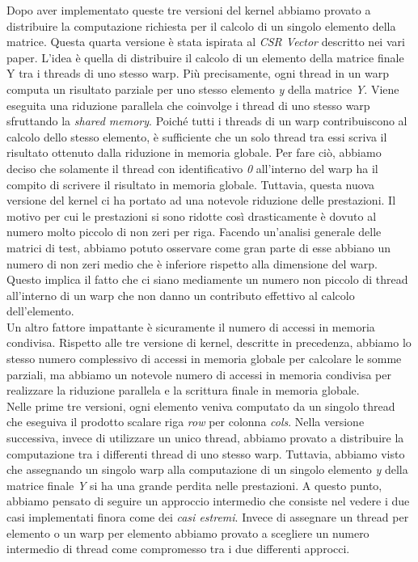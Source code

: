 \documentclass{article}
\begin{document}
Dopo aver implementato queste tre versioni del kernel abbiamo provato a distribuire la computazione richiesta per il calcolo di un singolo elemento della matrice. Questa quarta versione è stata ispirata al \textit{CSR Vector} descritto nei vari paper. L'idea è quella di distribuire il calcolo di un elemento della matrice finale Y tra i threads di uno stesso warp. Più precisamente, ogni thread in un warp computa un risultato parziale per uno stesso elemento \textit{y} della matrice \textit{Y}. Viene eseguita una riduzione parallela che coinvolge i thread di uno stesso warp sfruttando la \textit{shared memory}. Poiché tutti i threads di un warp contribuiscono al calcolo dello stesso elemento, è sufficiente che un solo thread tra essi scriva il risultato ottenuto dalla riduzione in memoria globale. Per fare ciò, abbiamo deciso che solamente il thread con identificativo \textit{0} all'interno del warp ha il compito di scrivere il risultato in memoria globale. Tuttavia, questa nuova versione del kernel ci ha portato ad una notevole riduzione delle prestazioni. Il motivo per cui le prestazioni si sono ridotte così drasticamente è dovuto al numero molto piccolo di non zeri per riga. Facendo un'analisi generale delle matrici di test, abbiamo potuto osservare come gran parte di esse abbiano un numero di non zeri medio che è inferiore rispetto alla dimensione del warp. Questo implica il fatto che ci siano mediamente un numero non piccolo di thread all'interno di un warp che non danno un contributo effettivo al calcolo dell'elemento. \\
Un altro fattore impattante è sicuramente il numero di accessi in memoria condivisa. Rispetto alle tre versione di kernel, descritte in precedenza, abbiamo lo stesso numero complessivo di accessi in memoria globale per calcolare le somme parziali, ma abbiamo un notevole numero di accessi in memoria condivisa per realizzare la riduzione parallela e la scrittura finale in memoria globale.
\\

Nelle prime tre versioni, ogni elemento veniva computato da un singolo thread che eseguiva il prodotto scalare riga \textit{row} per colonna \textit{cols}. Nella versione successiva, invece di utilizzare un unico thread, abbiamo provato a distribuire la computazione tra i differenti thread di uno stesso warp. Tuttavia, abbiamo visto che assegnando un singolo warp alla computazione di un singolo elemento \textit{y} della matrice finale \textit{Y} si ha una grande perdita nelle prestazioni. A questo punto, abbiamo pensato di seguire un approccio intermedio che consiste nel vedere i due casi implementati finora come dei \textit{casi estremi}. Invece di assegnare un thread per elemento o un warp per elemento abbiamo provato a scegliere un numero intermedio di thread come compromesso tra i due differenti approcci.\\
\end{document}
